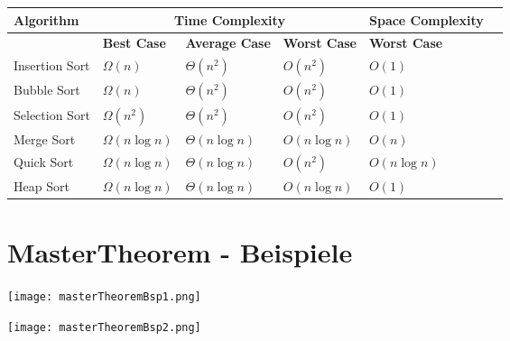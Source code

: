 \begin{table}[h]
    \scriptsize
    \begin{tabularx}{\textwidth}{l | X X X X | l}
        \toprule
    
        \textbf{Algorithm} & \multicolumn{3}{c|}{\textbf{Time Complexity}} & \textbf{Space Complexity} \\
        \midrule
        & \textbf{Best Case} &\textbf{Average Case} & \textbf{Worst Case} & \textbf{Worst Case} \\ 
        \midrule
        Insertion Sort & $\Omega(n)$ & $\Theta(n^2)$ & $O(n^2)$ & $O(1)$ \\
        \midrule
        Bubble Sort & $\Omega(n)$ & $\Theta(n^2)$ & $O(n^2)$ & $O(1)$ \\
        \midrule
        Selection Sort & $\Omega(n^2)$ & $\Theta(n^2)$ & $O(n^2)$ & $O(1)$ \\
        \midrule
        Merge Sort & $\Omega(n \log n)$ & $\Theta(n \log n)$ & $O(n \log n)$ & $O(n)$ \\
        \midrule
        Quick Sort & $\Omega(n \log n)$ & $\Theta(n \log n)$ & $O(n^2)$ & $O(n \log n)$ \\
        \midrule
        Heap Sort & $\Omega(n \log n)$ & $\Theta(n \log n)$ & $O(n \log n)$ & $O(1)$ \\
        \midrule

    \end{tabularx}
    \end{table}

\pagebreak

\section{MasterTheorem - Beispiele}
    \centerline{\texttt{[image: masterTheoremBsp1.png]}}
    \centerline{\texttt{[image: masterTheoremBsp2.png]}}
    
